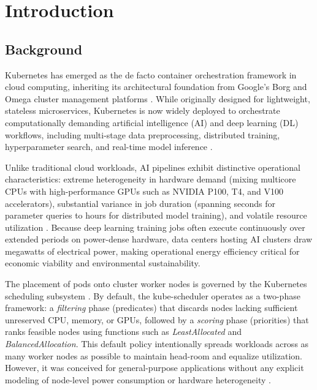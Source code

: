 \documentclass[a4paper,fleqn]{cas-dc}
\begin{document}
\section{Introduction}\label{sec:intro}

\subsection{Background}
Kubernetes has emerged as the de facto container orchestration framework in cloud computing, inheriting its architectural foundation from Google's Borg and Omega cluster management platforms \citep{burns2016borg}. While originally designed for lightweight, stateless microservices, Kubernetes is now widely deployed to orchestrate computationally demanding artificial intelligence (AI) and deep learning (DL) workflows, including multi-stage data preprocessing, distributed training, hyperparameter search, and real-time model inference \citep{senjab2023survey,weng2022mlaas}. 

Unlike traditional cloud workloads, AI pipelines exhibit distinctive operational characteristics: extreme heterogeneity in hardware demand (mixing multicore CPUs with high-performance GPUs such as NVIDIA P100, T4, and V100 accelerators), substantial variance in job duration (spanning seconds for parameter queries to hours for distributed model training), and volatile resource utilization \citep{weng2022mlaas,gu2025greenflow}. Because deep learning training jobs often execute continuously over extended periods on power-dense hardware, data centers hosting AI clusters draw megawatts of electrical power, making operational energy efficiency critical for economic viability and environmental sustainability.

The placement of pods onto cluster worker nodes is governed by the Kubernetes scheduling subsystem \citep{carrion2022kubernetes}. By default, the kube-scheduler operates as a two-phase framework: a \emph{filtering} phase (predicates) that discards nodes lacking sufficient unreserved CPU, memory, or GPUs, followed by a \emph{scoring} phase (priorities) that ranks feasible nodes using functions such as \emph{LeastAllocated} and \emph{BalancedAllocation}. This default policy intentionally spreads workloads across as many worker nodes as possible to maintain head-room and equalize utilization. However, it was conceived for general-purpose applications without any explicit modeling of node-level power consumption or hardware heterogeneity \citep{senjab2023survey,rejiba2022custom}.
\end{document}
